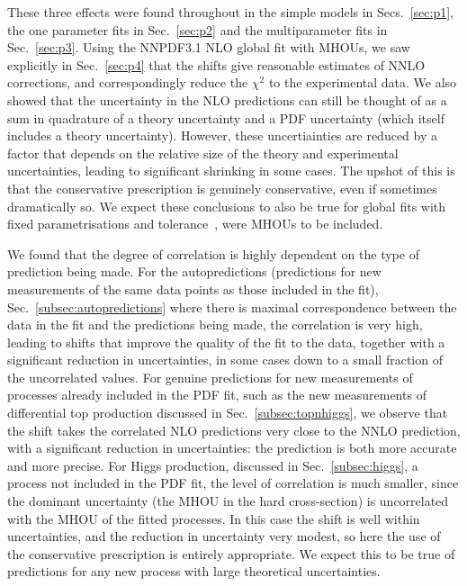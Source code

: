 These three effects were found throughout in the simple models in Secs.~\ref{sec:p1}, the one parameter fits in Sec.~\ref{sec:p2} and the multiparameter fits in Sec.~\ref{sec:p3}. Using the NNPDF3.1 NLO global fit with MHOUs, we saw explicitly in Sec.~\ref{sec:p4} that the shifts give reasonable estimates of NNLO corrections, and correspondingly reduce the $\chi^2$ to the experimental data. We also showed that the uncertainty in the NLO predictions can still be thought of as a sum in quadrature of a theory uncertainty and a PDF uncertainty (which itself includes a theory uncertainty). However, these uncertiainties are reduced by a factor that depends on the relative size of the theory and experimental uncertainties, leading to significant shrinking in some cases. The upshot of this is that the conservative prescription is genuinely conservative, even if sometimes dramatically so. We expect these conclusions to also be true for global fits with fixed parametrisations and tolerance~\cite{Bailey:2020ooq,Hou:2019efy}, were MHOUs to be included. 

We found that the degree of correlation is highly dependent on the type of prediction being made. For the autopredictions (predictions for new measurements of the same data points as those included in the fit), Sec.~\ref{subsec:autopredictions} where there is maximal correspondence between the data in the fit and the predictions being made, the correlation is very high, leading to shifts that improve the quality of the fit to the data, together with a significant reduction in uncertainties, in some cases down to a small fraction of the uncorrelated values. For genuine predictions for new measurements of processes already included in the PDF fit, such as the new measurements of differential top production discussed in Sec.~\ref{subsec:topnhiggs}, we observe that the shift takes the correlated NLO predictions very close to the NNLO prediction, with a significant reduction in uncertainties: the prediction is both more accurate and more precise. For Higgs production, discussed in Sec.~\ref{subsec:higgs}, a process not included in the PDF  fit, the level of correlation is much smaller, since the dominant uncertainty (the MHOU in the hard cross-section) is uncorrelated with the MHOU of the fitted processes. In this case the shift is well within uncertainties, and the reduction in uncertainty very modest, so here the use of the conservative prescription \cite{AbdulKhalek:2019ihb} is entirely appropriate. We expect this to be true of predictions for any new process with large theoretical uncertainties.

